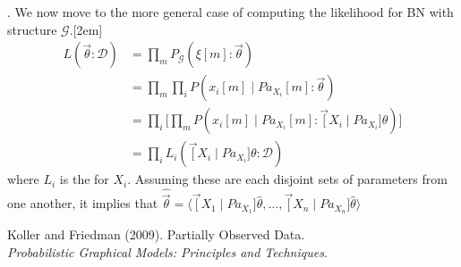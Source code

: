 \documentclass[11pt]{article}
\begin{document}
\myspace
\p {}. We now move to the more general case of computing the likelihood for BN with structure $\mathcal G$.[2em]
\begin{align}
	L(\vec{\theta} : \mathcal D) &= \prod_m P_{\mathcal G} (\xi[m] : \vec{\theta}) \\
	&= \prod_m \prod_i P(x_i[m] \mid Pa_{X_i}[m] : \vec{\theta}) \\
	&= \prod_i \bigg[ \prod_m  P(x_i[m] \mid Pa_{X_i}[m] : \vec[X_i \mid Pa_{X_i}]{\theta})  \bigg] \\
	&= \prod_i L_i (\vec[X_i \mid Pa_{X_i}]{\theta} : \mathcal D)
\end{align}
where $L_i$ is the  for $X_i$. Assuming these are each disjoint sets of parameters from one another, it implies that $\hat{\vec{\theta}} = \langle \vec[X_1 \mid Pa_{X_1}]{\hat{\theta}}, \ldots, \vec[X_n \mid Pa_{X_n}]{\hat{\theta}}   \rangle$







\vspace{-1.7em}
{\scriptsize Koller and Friedman (2009). Partially Observed Data.\\ \textit{Probabilistic Graphical Models: Principles and Techniques}.\\ }
\end{document}
